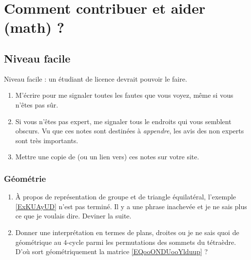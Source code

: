 \section{Comment contribuer et aider (math) ?}

\subsection{Niveau facile}

Niveau facile : un étudiant de licence devrait pouvoir le faire.

\begin{enumerate}
    \item
        M'écrire pour me signaler toutes les fautes que vous voyez, même si vous n'êtes pas sûr.
    \item
        Si vous n'êtes pas expert, me signaler tous le endroits qui vous semblent obscurs. Vu que ces notes sont destinées à \emph{appendre}, les avis des non experts sont très importants.
    \item
        Mettre une copie de (ou un lien vers) ces notes sur votre site.
\end{enumerate}

\subsubsection{Géométrie}

\begin{enumerate}
    \item
        À propos de représentation de groupe et de triangle équilatéral, l'exemple \ref{ExKUAyUD} n'est pas terminé. Il y a une phrase inachevée et je ne sais plus ce que je voulais dire. Deviner la suite.
    \item
        Donner une interprétation en termes de plans, droites ou je ne sais quoi de géométrique au \( 4\)-cycle parmi les permutations des sommets du tétraèdre. D'où sort géométriquement la matrice \eqref{EQooONDUooYlduup} ?
\end{enumerate}

